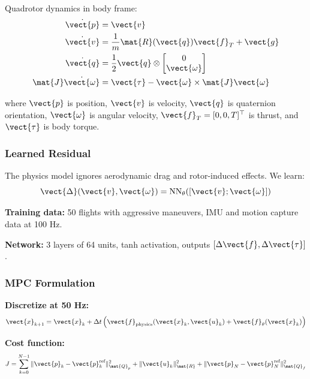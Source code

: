 Quadrotor dynamics in body frame:
\begin{align}
\dot{\vect{p}} &= \vect{v} \\
\dot{\vect{v}} &= \frac{1}{m}\mat{R}(\vect{q})\vect{f}_T + \vect{g} \\
\dot{\vect{q}} &= \frac{1}{2}\vect{q} \otimes \begin{bmatrix} 0 \\ \vect{\omega} \end{bmatrix} \\
\mat{J}\dot{\vect{\omega}} &= \vect{\tau} - \vect{\omega} \times \mat{J}\vect{\omega}
\end{align}

where $\vect{p}$ is position, $\vect{v}$ is velocity, $\vect{q}$ is quaternion orientation, $\vect{\omega}$ is angular velocity, $\vect{f}_T = [0, 0, T]^\top$ is thrust, and $\vect{\tau}$ is body torque.

\subsubsection{Learned Residual}

The physics model ignores aerodynamic drag and rotor-induced effects. We learn:
\begin{equation}
\vect{\Delta}(\vect{v}, \vect{\omega}) = \text{NN}_\theta([\vect{v}; \vect{\omega}])
\end{equation}

\textbf{Training data:} 50 flights with aggressive maneuvers, IMU and motion capture data at 100 Hz.

\textbf{Network:} 3 layers of 64 units, tanh activation, outputs $[\Delta \vect{f}, \Delta \vect{\tau}]$.

\subsubsection{MPC Formulation}

\textbf{Discretize at 50 Hz:}
\begin{equation}
\vect{x}_{k+1} = \vect{x}_k + \Delta t \left(\vect{f}_{\text{physics}}(\vect{x}_k, \vect{u}_k) + \vect{f}_\theta(\vect{x}_k)\right)
\end{equation}

\textbf{Cost function:}
\begin{equation}
J = \sum_{k=0}^{N-1} \|\vect{p}_k - \vect{p}_k^{\text{ref}}\|_{\mat{Q}_p}^2 + \|\vect{u}_k\|_{\mat{R}}^2 + \|\vect{p}_N - \vect{p}_N^{\text{ref}}\|_{\mat{Q}_f}^2
\end{equation}

